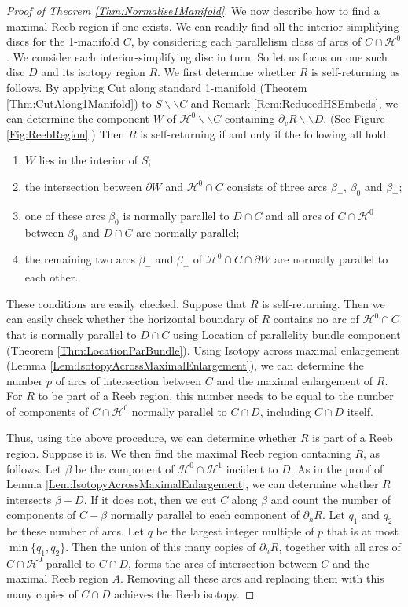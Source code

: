 \documentclass[oneside]{amsart}
\numberwithin{equation}{section}
\theoremstyle{plain}
\theoremstyle{definition}
\newcommand{\cut}{\backslash\backslash}
\newcommand{\calH}{\mathcal{H}}
\begin{document}
\begin{proof}[Proof of Theorem \ref{Thm:Normalise1Manifold}]
We now describe how to find a maximal Reeb region if one exists. We can readily find all the interior-simplifying discs for the 1-manifold $C$, by considering each parallelism class of arcs of $C \cap \calH^0$. We consider each interior-simplifying disc in turn. So let us focus on one such disc $D$ and its isotopy region $R$. We first determine whether $R$ is self-returning as follows. By applying {\sc Cut along standard 1-manifold} (Theorem \ref{Thm:CutAlong1Manifold}) to $S \cut C$ and Remark \ref{Rem:ReducedHSEmbeds}, we can  determine the component $W$ of $\calH^0 \cut C$ containing $\partial_v R \cut D$. (See Figure \ref{Fig:ReebRegion}.) Then $R$ is self-returning if and only if the following all hold:
\begin{enumerate}
\item $W$ lies in the interior of $S$;
\item the intersection between $\partial W$ and $\calH^0 \cap C$ consists of three arcs $\beta_-$, $\beta_0$ and $\beta_+$;
\item one of these arcs $\beta_0$ is normally parallel to $D \cap C$ and all arcs of $C \cap \calH^0$ between $\beta_0$ and $D \cap C$ are normally parallel;
\item the remaining two arcs $\beta_-$ and $\beta_+$ of $\calH^0 \cap C \cap \partial W$ are normally parallel to each other.
\end{enumerate}
These conditions are easily checked. Suppose that $R$ is self-returning. Then we can easily check whether the horizontal boundary of $R$ contains no arc of $\calH^0 \cap C$ that is normally parallel to $D \cap C$ using {\sc Location of parallelity bundle component} (Theorem \ref{Thm:LocationParBundle}). Using {\sc Isotopy across maximal enlargement} (Lemma \ref{Lem:IsotopyAcrossMaximalEnlargement}), we can determine the number $p$ of arcs of intersection between $C$ and the maximal enlargement of $R$. For $R$ to be part of a Reeb region, this number needs to be equal to the number of components of $C \cap \calH^0$ normally parallel to $C \cap D$, including $C \cap D$ itself. 

Thus, using the above procedure, we can determine whether $R$ is part of a Reeb region. Suppose it is. We then find the maximal Reeb region containing $R$, as follows. Let $\beta$ be the component of $\calH^0 \cap \calH^1$ incident to $D$. As in the proof of Lemma \ref{Lem:IsotopyAcrossMaximalEnlargement}, we can determine whether $R$ intersects $\beta - D$. If it does not, then we cut $C$ along $\beta$ and count the number of components of $C - \beta$ normally parallel to each component of $\partial_h R$. Let $q_1$ and $q_2$ be these number of arcs. Let $q$ be the largest integer multiple of $p$ that is at most $\min \{ q_1, q_2 \}$. Then the union of this many copies of $\partial_h R$, together with all arcs of $C \cap \calH^0$ parallel to $C \cap D$, forms the arcs of intersection between $C$ and the maximal Reeb region $A$. Removing all these arcs and replacing them with this many copies of $C \cap D$ achieves the Reeb isotopy. 


\end{proof}
\end{document}
